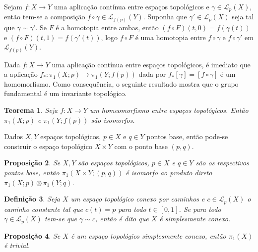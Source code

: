 \documentclass[12pt]{book}
\newtheorem{teorema}{Teorema}[section]
\newtheorem{definicao}[teorema]{Definição}
\newtheorem{proposicao}[teorema]{Proposição}
\newcommand{\caminhos}{\mathcal{L}}
\newcommand{\caminhospontobasegeral}[2]{\caminhos_{#1}(#2)}
\newcommand{\classe}[1]{[#1]}
\newcommand{\grupofundamental}[1]{\pi_{1}(#1)}
\newcommand{\grupofundamentalpontobase}[2]{\pi_{1}(#1; #2)}
\newcommand{\intervalo}{[0,1]}
\begin{document}
	
	Sejam $f:X\to Y$ uma aplicação contínua entre espaços topológicos e $\gamma \in \caminhospontobasegeral{p}{X}$, então tem-se a composição $f\circ \gamma \in \caminhospontobasegeral{f(p)}{Y}$. Suponha que $\gamma' \in \caminhospontobasegeral{p}{X}$ seja tal que $\gamma \sim \gamma'$. Se $F$ é a homotopia entre ambas, então $(f\circ F)(t,0) =  f(\gamma(t))$ e $(f\circ F)(t,1) =  f(\gamma'(t)) $, logo $f\circ F$ é uma homotopia entre $f\circ \gamma$ e $f\circ \gamma'$ em $\caminhospontobasegeral{f(p)}{Y}$.
	
	Dada $f:X\to Y$ uma aplicação contínua entre espaços topológicos, é imediato que a aplicação $f_{*}:\grupofundamentalpontobase{X}{p} \to \grupofundamentalpontobase{Y}{f(p)}$ dada por $f_{*}\classe{\gamma} = \classe{f\circ\gamma}$ é um homomorfismo. Como consequência, o seguinte resultado mostra que o grupo fundamental é um invariante topológico.
	
	\begin{teorema}
		Seja $f:X\to Y$ um homeomorfismo entre espaços topológicos. Então $\grupofundamentalpontobase{X}{p}$ e $\grupofundamentalpontobase{Y}{f(p)}$ são isomorfos.
	\end{teorema}
	
	Dados $X, Y$ espaços topológicos, $p\in X$ e $q\in Y$ pontos base, então pode-se construir o espaço topológico $X\times Y$ com o ponto base $(p,q)$.
	
	\begin{proposicao}\label{proposicao_produto_grupo_fundamental}
		Se $X, Y$ são espaços topológicos, $p\in X$ e $q\in Y$ são os respectivos pontos base, então $\grupofundamentalpontobase{X\times Y}{(p,q)}$ é isomorfo ao produto direto $\grupofundamentalpontobase{X}{p}\otimes \grupofundamentalpontobase{Y}{q}$.
	\end{proposicao}
	
	\begin{definicao}
		Seja $X$ um espaço topológico conexo por caminhos e
		$c \in \caminhospontobasegeral{p}{X}$ o caminho constante tal que $c(t) = p$ para todo $t \in \intervalo$. Se para todo $\gamma \in \caminhospontobasegeral{p}{X}$ tem-se que $\gamma \sim c$, então é dito que $X$ é simplesmente conexo.
	\end{definicao}
	
	\begin{proposicao}\label{proposicao_grupo_fundamental_simplesmente_conexo}
		Se $X$ é um espaço topológico simplesmente conexo, então $\grupofundamental{X}$ é trivial.
	\end{proposicao}
	
\end{document}
